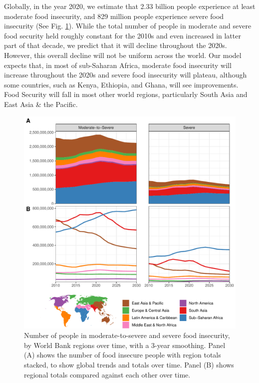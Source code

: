 \documentclass{article}
\begin{document}
Globally, in the year 2020, we estimate that 2.33 billion people experience at least moderate food insecurity, and 829 million people experience severe food insecurity (See Fig. \ref{fig:timeseries}).  While the total number of people in moderate and severe food security held roughly constant for the 2010s and even increased in latter part of that decade, we predict that it will decline throughout the 2020s.  However, this overall decline will not be uniform across the world.  Our model expects that, in most of sub-Saharan Africa, moderate food insecurity will increase throughout the 2020s and severe food insecurity will plateau, although some countries, such as Kenya, Ethiopia, and Ghana, will see improvements.  Food Security will fall in most other world regions, particularly South Asia and East Asia \& the Pacific.  

\begin{figure}[H]
  \centering
  \includegraphics[width=\linewidth]{img/TimeSeries.pdf}
  \caption{Number of people in moderate-to-severe and severe food insecurity, by World Bank regions over time, with a 3-year smoothing.  Panel (A) shows the number of food insecure people with region totals stacked, to show global trends and totals over time.  Panel (B) shows regional totals compared against each other over time.}
  \label{fig:timeseries}
\end{figure}
\end{document}
